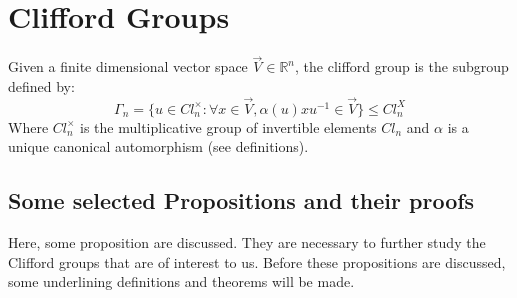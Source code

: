 \documentclass[12pt,onecolumn,letterpaper]{article} %
\begin{document}
\section{Clifford Groups}\label{Groupss}
Given a finite dimensional vector space $\vec{V}\in \mathbb{R}^n$, the clifford group is the subgroup defined by:
\begin{equation}
    \Gamma_n=\{u\in Cl_n^{\times} : \forall x\in\vec{V}, \alpha(u)xu^{-1}\in\vec{V}\}\le  Cl_n^X\label{cliffordg}
\end{equation}
Where $Cl_n^{\times}$ is the multiplicative group of invertible elements $Cl_n$ and $\alpha$ is a unique canonical automorphism (see definitions).
\subsection{Some selected Propositions and their proofs}
Here, some proposition are discussed. They are necessary to further study the Clifford groups that are of interest to us. Before these propositions are discussed, some underlining definitions and theorems will be made.
\end{document}
